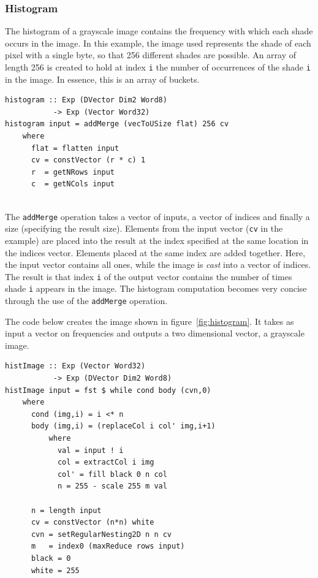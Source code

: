 \subsubsection{Histogram}
\FloatBarrier

The histogram of a grayscale image contains the frequency with 
which each shade occurs in the image. In this example, the image used represents 
the shade of each pixel with a single byte, so that
256 different shades are possible. An array of length 256 is created to hold at index 
{\tt i} the number of occurrences of the shade {\tt i} in the image. In essence, this 
is an array of buckets. 

\begin{verbatim}
histogram :: Exp (DVector Dim2 Word8)  
           -> Exp (Vector Word32)
histogram input = addMerge (vecToUSize flat) 256 cv
    where
      flat = flatten input
      cv = constVector (r * c) 1 
      r  = getNRows input 
      c  = getNCols input
      
\end{verbatim}

The {\tt addMerge} operation takes a vector of inputs, a vector of 
indices and finally a size (specifying the result size). Elements from the 
input vector ({\tt cv} in the example) are placed into the result
at the index specified at 
the same location in the indices vector. Elements placed at the same
index are added together. Here, the input vector contains all ones, 
while the image is {\em cast} into a vector of indices.
The result 
is that index {\tt i} of the output vector contains the number of times
shade {\tt i} appears in the image.
The histogram
computation becomes very concise through the use of the {\tt addMerge} operation.

The code below creates the image shown in figure~\ref{fig:histogram}. It 
takes as input a vector on frequencies and outputs a two dimensional vector, 
a grayscale image. 

\begin{Verbatim}[samepage=true]
histImage :: Exp (Vector Word32) 
           -> Exp (DVector Dim2 Word8) 
histImage input = fst $ while cond body (cvn,0)    
    where 
      cond (img,i) = i <* n 
      body (img,i) = (replaceCol i col' img,i+1) 
          where 
            val = input ! i 
            col = extractCol i img
            col' = fill black 0 n col
            n = 255 - scale 255 m val  
                    
      n = length input 
      cv = constVector (n*n) white  
      cvn = setRegularNesting2D n n cv
      m   = index0 (maxReduce rows input)
      black = 0 
      white = 255
\end{Verbatim}

